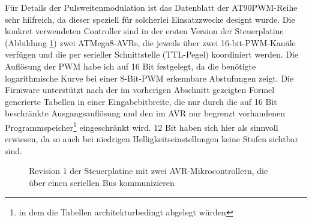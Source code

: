 \documentclass[12pt,a4paper,notitlepage]{article}
\begin{document}
Für Details der Pulsweitenmodulation ist das Datenblatt der AT90PWM-Reihe sehr hilfreich, da dieser speziell für solcherlei Einsatzzwecke designt wurde\cite{ATMEL2}. Die konkret verwendeten Controller sind in der ersten Version der Steuerplatine (Abbildung \ref{controller_rev1}) zwei ATMega8-AVRs, die jeweils über zwei 16-bit-PWM-Kanäle verfügen und die per serieller Schnittstelle (TTL-Pegel) koordiniert werden. Die Auflösung der PWM habe ich auf 16 Bit festgelegt, da die benötigte logarithmische Kurve bei einer 8-Bit-PWM erkennbare Abstufungen zeigt. Die Firmware unterstützt nach der im vorherigen Abschnitt %
gezeigten Formel generierte Tabellen in einer Eingabebitbreite, die nur durch die auf 16 Bit beschränkte Ausgangsauflösung und den im AVR nur begrenzt vorhandenen Programmspeicher\footnote{in dem die Tabellen architekturbedingt abgelegt würden}  eingeschränkt wird. 12 Bit haben sich hier als sinnvoll erwiesen, da so auch bei %
niedrigen Helligkeitseinstellungen keine Stufen sichtbar sind.

\begin{figure}
\centering
{}
\caption{Revision 1 der Steuerplatine mit zwei AVR-Mikrocontrollern, die über einen seriellen Bus kommunizieren}
\label{controller_rev1}
\end{figure}
\end{document}
